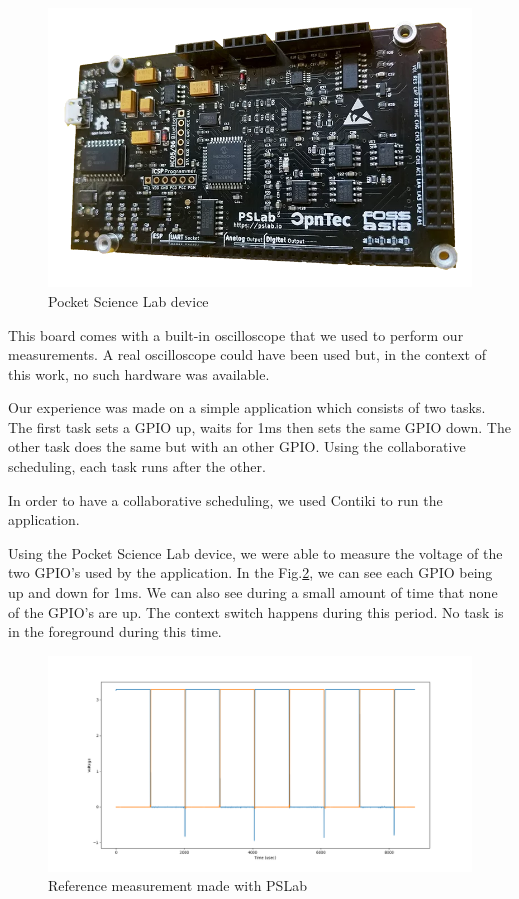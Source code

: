 \documentclass[a4paper, 10pt, conference]{ieeeconf}      %
\begin{document}
\begin{figure}[!h]
    \centering
    \includegraphics[scale=0.2]{pslab.png}
    \caption{Pocket Science Lab device}
    \label{fig:pslab}
\end{figure}

This board comes with a built-in oscilloscope that we used to perform our measurements.
A real oscilloscope could have been used but, in the context of this work, no such hardware was available.

Our experience was made on a simple application which consists of two tasks.
The first task sets a GPIO up, waits for 1ms then sets the same GPIO down.
The other task does the same but with an other GPIO.
Using the collaborative scheduling, each task runs after the other.

In order to have a collaborative scheduling, we used Contiki to run the application.

Using the Pocket Science Lab device, we were able to measure the voltage of the two GPIO's used by the application.
In the Fig.\ref{fig:ref}, we can see each GPIO being up and down for 1ms.
We can also see during a small amount of time that none of the GPIO's are up.
The context switch happens during this period.
No task is in the foreground during this time.


\begin{figure}[!h]
    \centering
    \includegraphics[scale=0.2]{ref.png}
    \caption{Reference measurement made with PSLab}
    \label{fig:ref}
\end{figure}
\end{document}
